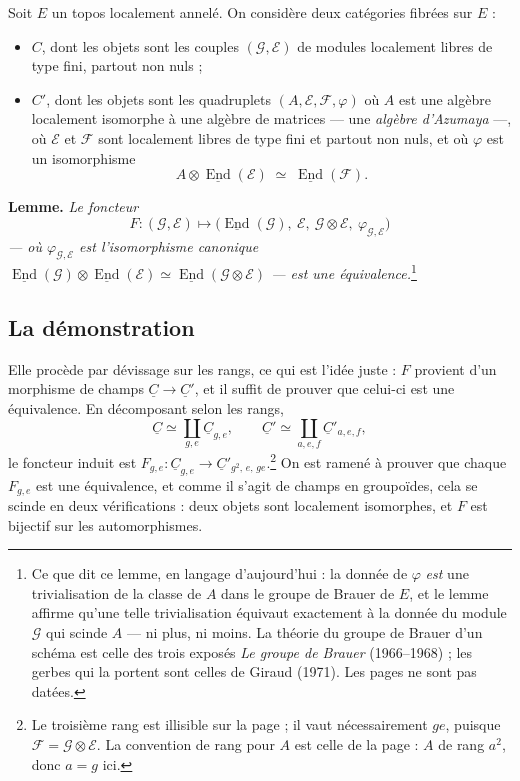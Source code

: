 \documentclass[11pt,a4paper]{article}
\begin{document}
Soit $E$ un topos localement annelé. On considère deux catégories fibrées sur
$E$ :

\begin{itemize}
\item $C$, dont les objets sont les couples $(\mathcal{G}, \mathcal{E})$ de
modules localement libres de type fini, partout non nuls ;
\item $C'$, dont les objets sont les quadruplets
$(A, \mathcal{E}, \mathcal{F}, \varphi)$ où $A$ est une algèbre localement
isomorphe à une algèbre de matrices — une \emph{algèbre d'Azumaya} —, où
$\mathcal{E}$ et $\mathcal{F}$ sont localement libres de type fini et partout
non nuls, et où $\varphi$ est un isomorphisme
\[
A \otimes \underline{\operatorname{End}}(\mathcal{E}) \;\simeq\;
\underline{\operatorname{End}}(\mathcal{F}).
\]
\end{itemize}

\textbf{Lemme.} \emph{Le foncteur}
\[
F : (\mathcal{G}, \mathcal{E}) \longmapsto
\bigl(\underline{\operatorname{End}}(\mathcal{G}),\ \mathcal{E},\
\mathcal{G} \otimes \mathcal{E},\ \varphi_{\mathcal{G},\mathcal{E}}\bigr)
\]
\emph{— où $\varphi_{\mathcal{G},\mathcal{E}}$ est l'isomorphisme canonique
$\underline{\operatorname{End}}(\mathcal{G}) \otimes
\underline{\operatorname{End}}(\mathcal{E}) \simeq
\underline{\operatorname{End}}(\mathcal{G} \otimes \mathcal{E})$ — est une
équivalence.}\footnote{Ce que dit ce lemme, en langage d'aujourd'hui : la
donnée de $\varphi$ \emph{est} une trivialisation de la classe de $A$ dans le
groupe de Brauer de $E$, et le lemme affirme qu'une telle trivialisation
équivaut exactement à la donnée du module $\mathcal{G}$ qui scinde $A$ — ni
plus, ni moins. La théorie du groupe de Brauer d'un schéma est celle des trois
exposés \emph{Le groupe de Brauer} (1966--1968) ; les gerbes qui la portent
sont celles de Giraud (1971). Les pages ne sont pas datées.}

\subsection*{La démonstration}

Elle procède par dévissage sur les rangs, ce qui est l'idée juste : $F$
provient d'un morphisme de champs $\underline{C} \to \underline{C}'$, et il
suffit de prouver que celui-ci est une équivalence. En décomposant selon les
rangs,
\[
\underline{C} \simeq \coprod_{g,e} \underline{C}_{g,e},
\qquad
\underline{C}' \simeq \coprod_{a,e,f} \underline{C}'_{a,e,f},
\]
le foncteur induit est $F_{g,e} : \underline{C}_{g,e} \to
\underline{C}'_{g^{2},\,e,\,ge}$.\footnote{Le troisième rang est illisible sur
la page ; il vaut nécessairement $ge$, puisque $\mathcal{F} = \mathcal{G}
\otimes \mathcal{E}$. La convention de rang pour $A$ est celle de la page :
$A$ de rang $a^{2}$, donc $a = g$ ici.} On est ramené à prouver que chaque
$F_{g,e}$ est une équivalence, et comme il s'agit de champs en groupoïdes,
cela se scinde en deux vérifications : deux objets sont localement isomorphes,
et $F$ est bijectif sur les automorphismes.
\end{document}
